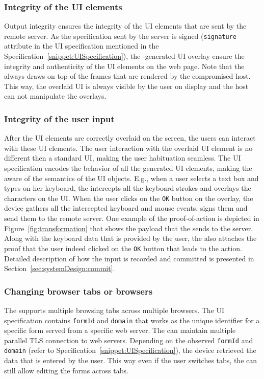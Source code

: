 \subsubsection{Integrity of the UI elements} Output integrity ensures the integrity of the UI elements that are sent by the remote server. As the specification sent by the server is signed (\texttt{signature} attribute in the UI specification mentioned in the Specification~\ref{snippet:UISpecification}), the \device-generated UI overlay ensure the integrity and authenticity of the UI elements on the web page. Note that the \device always draws on top of the frames that are rendered by the compromised host. This way, the overlaid UI is always visible by the user on display and the host can not manipulate the overlays.

\subsubsection{Integrity of the user input} After the UI elements are correctly overlaid on the screen, the users can interact with these UI elements. The user interaction with the overlaid UI element is no different then a standard UI, making the user habituation seamless. The UI specification encodes the behavior of all the generated UI elements, making the \device aware of the semantics of the UI objects. E.g., when a user selects a text box and types on her keyboard, the \device intercepts all the keyboard strokes and overlays the characters on the UI. When the user clicks on the \texttt{OK} button on the overlay, the device gathers all the intercepted keyboard and mouse events, signs them and send them to the remote server. One example of the proof-of-action is depicted in Figure~\ref{fig:transformation} that shows the payload that the \device sends to the server. Along with the keyboard data that is provided by the user, the \device also attaches the proof that the user indeed clicked on the \texttt{OK} button that leads to the action. Detailed description of how the input is recorded and committed is presented in Section~\ref{sec:systemDesign:commit}.


\subsubsection{Changing browser tabs or browsers}
The \device supports multiple browsing tabs across multiple browsers. The UI specification contains \texttt{formId} and \texttt{domain} that works as the unique identifier for a specific form served from a specific web server. The \device can maintain multiple parallel TLS connection to web servers. Depending on the observed \texttt{formId} and \texttt{domain} (refer to Specification~\ref{snippet:UISpecification}), the device retrieved the data that is entered by the user. This way even if the user switches tabs, the \device can still allow editing the forms across tabs. 



